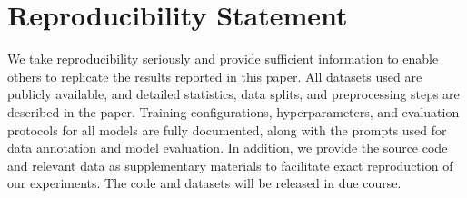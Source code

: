 \section*{Reproducibility Statement}
We take reproducibility seriously and provide sufficient information to enable others to replicate the results reported in this paper. All datasets used are publicly available, and detailed statistics, data splits, and preprocessing steps are described in the paper. Training configurations, hyperparameters, and evaluation protocols for all models are fully documented, along with the prompts used for data annotation and model evaluation. In addition, we provide the source code and relevant data as supplementary materials to facilitate exact reproduction of our experiments. The code and datasets will be released in due course.